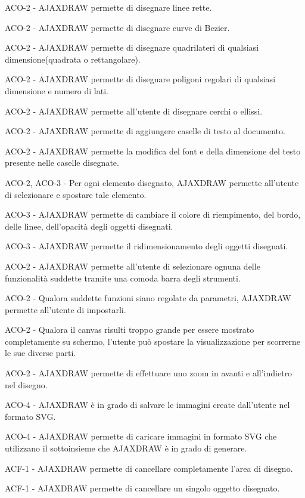 \begin{elenconumerato}{\subsubsecindent}
\item{ACO-2 - AJAXDRAW permette di disegnare linee rette.}
\item{ACO-2 - AJAXDRAW permette di disegnare curve di Bezier.}
\item{ACO-2 - AJAXDRAW permette di disegnare quadrilateri di qualsiasi dimensione(quadrata o rettangolare).}
\item{ACO-2 - AJAXDRAW permette di disegnare poligoni regolari di qualsiasi dimensione e numero di lati.}
\item{ACO-2 - AJAXDRAW permette all'utente di disegnare cerchi o ellissi.}
\item{ACO-2 - AJAXDRAW permette di aggiungere caselle di testo al documento. }
\item{ACO-2 - AJAXDRAW permette la modifica del font e della dimensione del testo presente nelle caselle disegnate.}
\item{ACO-2, ACO-3 - Per ogni elemento disegnato, AJAXDRAW permette all'utente di selezionare e spostare tale elemento.}
\item{ACO-3 - AJAXDRAW permette di cambiare il colore di riempimento, del bordo, delle linee, dell'opacit\`a degli oggetti disegnati.}
\item{ACO-3 - AJAXDRAW permette il ridimensionamento degli oggetti disegnati.}
\item{ACO-2 - AJAXDRAW permette all'utente di selezionare ognuna delle funzionalit\`a suddette tramite una comoda barra degli strumenti.}
\item{ACO-2 - Qualora suddette funzioni siano regolate da parametri, AJAXDRAW permette all'utente di impostarli.}
\item {ACO-2 - Qualora il canvas risulti troppo grande per essere mostrato completamente su schermo, l'utente pu\`o spostare la visualizzazione per scorrerne le sue diverse parti.}
\item{ACO-2 - AJAXDRAW permette di effettuare uno zoom in avanti e all'indietro nel disegno.}
\item{ACO-4 - AJAXDRAW \`e in grado di salvare le immagini create dall'utente nel formato SVG.}
\item{ACO-4 - AJAXDRAW permette di caricare immagini in formato SVG che utilizzano il sottoinsieme che AJAXDRAW \`e in grado di generare.}
\item{ACF-1 - AJAXDRAW permette di cancellare completamente l'area di disegno.}
\item{ACF-1 - AJAXDRAW permette di cancellare un singolo oggetto disegnato.}
\end{elenconumerato}

